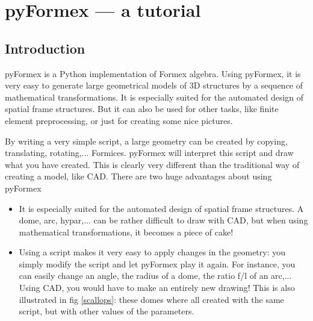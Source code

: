 \documentclass[a4paper]{manual}
\newcommand{\pyformex}{pyFormex\xspace}
\begin{document}
\chapter{pyFormex --- a tutorial}
{\label{cha:tutorial}


\section{Introduction}
\label{sec:intro-tut}
\pyformex is a Python implementation of Formex algebra. Using \pyformex, it is very easy to  generate large geometrical models of 3D structures by a sequence of mathematical transformations. It is especially suited for the automated design of spatial frame structures. But it can also be used for other tasks, like finite element preprocessing, or just for creating some nice pictures.

By writing a very simple script, a large geometry can be created by copying, translating, rotating,... Formices. \pyformex will interpret this script and draw what you have created. This is clearly very different than the traditional way of creating a model, like CAD. There are two huge advantages about using \pyformex

\begin{itemize}
\item It is especially suited for the automated design of spatial frame structures. A dome, arc, hypar,... can be rather difficult to draw with CAD, but when using mathematical transformations, it becomes a piece of cake!
\item Using a script makes it very easy to apply changes in the geometry: you simply modify the script and let \pyformex play it again. For instance, you can easily change an angle, the radius of a dome, the ratio f/l of an arc,... Using CAD, you would have to make an entirely new drawing! This is also illustrated in fig \ref{scallops}: these domes where all created with the same script, but with other values of the parameters.
\end{itemize}

}
\end{document}
